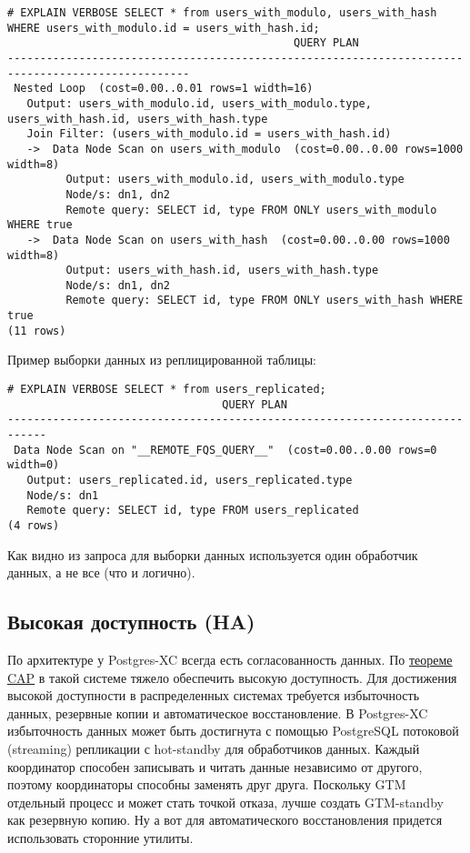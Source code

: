 \begin{lstlisting}[label=lst:postgres-xc8,caption=Выборка записей из распределенной таблицы]
# EXPLAIN VERBOSE SELECT * from users_with_modulo, users_with_hash WHERE users_with_modulo.id = users_with_hash.id;
                                            QUERY PLAN
--------------------------------------------------------------------------------------------------
 Nested Loop  (cost=0.00..0.01 rows=1 width=16)
   Output: users_with_modulo.id, users_with_modulo.type, users_with_hash.id, users_with_hash.type
   Join Filter: (users_with_modulo.id = users_with_hash.id)
   ->  Data Node Scan on users_with_modulo  (cost=0.00..0.00 rows=1000 width=8)
         Output: users_with_modulo.id, users_with_modulo.type
         Node/s: dn1, dn2
         Remote query: SELECT id, type FROM ONLY users_with_modulo WHERE true
   ->  Data Node Scan on users_with_hash  (cost=0.00..0.00 rows=1000 width=8)
         Output: users_with_hash.id, users_with_hash.type
         Node/s: dn1, dn2
         Remote query: SELECT id, type FROM ONLY users_with_hash WHERE true
(11 rows)
\end{lstlisting}

Пример выборки данных из реплицированной таблицы:

\begin{lstlisting}[label=lst:postgres-xc22,caption=Выборка записей из реплицированной таблицы]
# EXPLAIN VERBOSE SELECT * from users_replicated;
                                 QUERY PLAN
----------------------------------------------------------------------------
 Data Node Scan on "__REMOTE_FQS_QUERY__"  (cost=0.00..0.00 rows=0 width=0)
   Output: users_replicated.id, users_replicated.type
   Node/s: dn1
   Remote query: SELECT id, type FROM users_replicated
(4 rows)
\end{lstlisting}

Как видно из запроса для выборки данных используется один обработчик данных, а не все (что и логично).

\subsection{Высокая доступность (HA)}

По архитектуре у Postgres-XC всегда есть согласованность данных. По \href{http://en.wikipedia.org/wiki/CAP\_theorem}{теореме CAP} в такой системе тяжело обеспечить высокую доступность. Для достижения высокой доступности в распределенных системах требуется избыточность данных, резервные копии и автоматическое восстановление. В Postgres-XC избыточность данных может быть достигнута с помощью PostgreSQL потоковой (streaming) репликации с hot-standby для обработчиков данных. Каждый координатор способен записывать и читать данные независимо от другого, поэтому координаторы способны заменять друг друга. Поскольку GTM отдельный процесс и может стать точкой отказа, лучше создать GTM-standby как резервную копию. Ну а вот для автоматического восстановления придется использовать сторонние утилиты.

